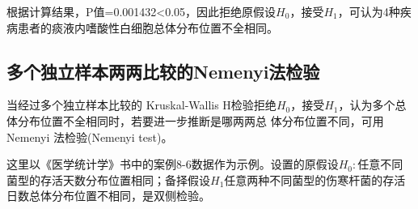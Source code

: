 \documentclass[
]{article}
\newenvironment{Shaded}{\begin{snugshade}}{\end{snugshade}}
\newcommand{\CommentTok}[1]{\textcolor[rgb]{0.56,0.35,0.01}{\textit{#1}}}
\newcommand{\DataTypeTok}[1]{\textcolor[rgb]{0.13,0.29,0.53}{#1}}
\newcommand{\KeywordTok}[1]{\textcolor[rgb]{0.13,0.29,0.53}{\textbf{#1}}}
\newcommand{\NormalTok}[1]{#1}
\newcommand{\OperatorTok}[1]{\textcolor[rgb]{0.81,0.36,0.00}{\textbf{#1}}}
\begin{document}
\begin{Shaded}
\end{Shaded}

根据计算结果，P值=0.001432\textless0.05，因此拒绝原假设\(H_0\)，接受\(H_1\)，可认为4种疾病患者的痰液内嗜酸性白细胞总体分布位置不全相同。

\hypertarget{ux591aux4e2aux72ecux7acbux6837ux672cux4e24ux4e24ux6bd4ux8f83ux7684nemenyiux6cd5ux68c0ux9a8c}{%
\subsection{多个独立样本两两比较的Nemenyi法检验}\label{ux591aux4e2aux72ecux7acbux6837ux672cux4e24ux4e24ux6bd4ux8f83ux7684nemenyiux6cd5ux68c0ux9a8c}}

当经过多个独立样本比较的 Kruskal-Wallis H检验拒绝\(H_0\)，接受\(H_1\)，认为多个总体分布位置不全相同时，若要进一步推断是哪两两总
体分布位置不同，可用 Nemenyi 法检验(Nemenyi test)。

这里以《医学统计学》书中的案例8-6数据作为示例。设置的原假设\(H_0:\)任意不同菌型的存活天数分布位置相同；备择假设\(H_1\)任意两种不同菌型的伤寒杆菌的存活日数总体分布位置不相同，是双侧检验。
\end{document}
